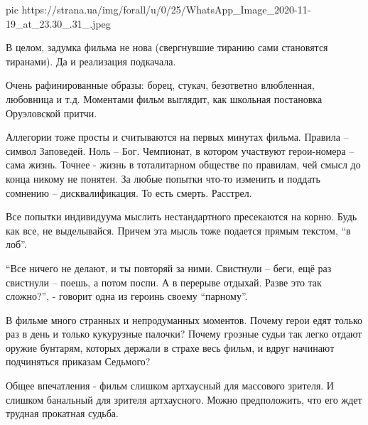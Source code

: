 \ifcmt
pic https://strana.ua/img/forall/u/0/25/WhatsApp_Image_2020-11-19_at_23.30_.31_.jpeg
\fi

В целом, задумка фильма не нова (свергнувшие тиранию сами становятся
тиранами). Да и реализация подкачала.

Очень рафинированные образы: борец, стукач, безответно влюбленная,
любовница и т.д. Моментами фильм выглядит, как школьная постановка
Оруэловской притчи.

Аллегории тоже просты и считываются на первых минутах фильма. Правила –
символ Заповедей. Ноль – Бог. Чемпионат, в котором участвуют герои-номера
– сама жизнь. Точнее - жизнь в тоталитарном обществе по правилам, чей
смысл до конца никому не понятен. За любые попытки что-то изменить и
поддать сомнению – дисквалификация. То есть смерть. Расстрел.

Все попытки индивидуума мыслить нестандартного пресекаются на корню. Будь
как все, не выделывайся. Причем эта мысль тоже подается прямым текстом, \enquote{в
лоб}.

\enquote{Все ничего не делают, и ты повторяй за ними. Свистнули – беги, ещё раз
свистнули – поешь, а потом поспи. А в перерыве отдыхай. Разве это так
сложно?}, - говорит одна из героинь своему 
\enquote{парному}.

В фильме много странных и непродуманных моментов. Почему герои едят только
раз в день и только кукурузные палочки? Почему грозные судьи так легко
отдают оружие бунтарям, которых держали в страхе весь фильм, и вдруг
начинают подчиняться приказам Седьмого?

Общее впечатления - фильм слишком артхаусный для массового зрителя. И
слишком банальный для зрителя артхаусного. Можно предположить, что его
ждет трудная прокатная судьба.
